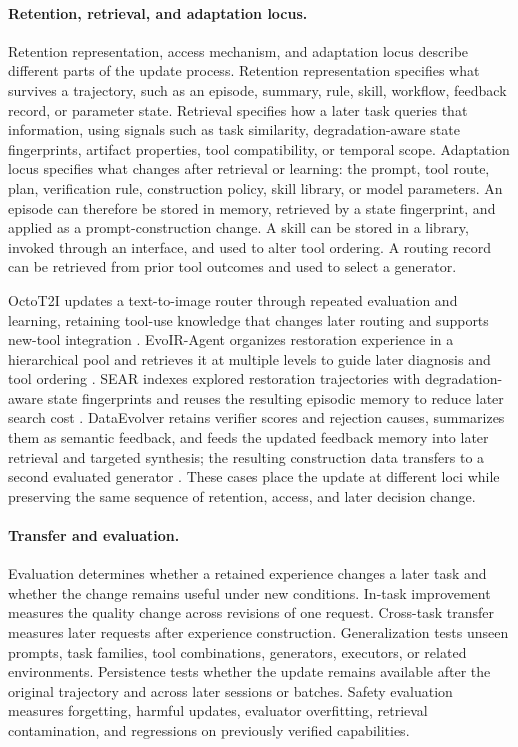 \paragraph{Retention, retrieval, and adaptation locus.}
Retention representation, access mechanism, and adaptation locus describe different parts of the update process. Retention representation specifies what survives a trajectory, such as an episode, summary, rule, skill, workflow, feedback record, or parameter state. Retrieval specifies how a later task queries that information, using signals such as task similarity, degradation-aware state fingerprints, artifact properties, tool compatibility, or temporal scope. Adaptation locus specifies what changes after retrieval or learning: the prompt, tool route, plan, verification rule, construction policy, skill library, or model parameters. An episode can therefore be stored in memory, retrieved by a state fingerprint, and applied as a prompt-construction change. A skill can be stored in a library, invoked through an interface, and used to alter tool ordering. A routing record can be retrieved from prior tool outcomes and used to select a generator.

OctoT2I updates a text-to-image router through repeated evaluation and learning, retaining tool-use knowledge that changes later routing and supports new-tool integration \cite{jiang2026octot2i}. EvoIR-Agent organizes restoration experience in a hierarchical pool and retrieves it at multiple levels to guide later diagnosis and tool ordering \cite{avg260522208}. SEAR indexes explored restoration trajectories with degradation-aware state fingerprints and reuses the resulting episodic memory to reduce later search cost \cite{avg260628971}. DataEvolver retains verifier scores and rejection causes, summarizes them as semantic feedback, and feeds the updated feedback memory into later retrieval and targeted synthesis; the resulting construction data transfers to a second evaluated generator \cite{avg260631537}. These cases place the update at different loci while preserving the same sequence of retention, access, and later decision change.

\paragraph{Transfer and evaluation.}
Evaluation determines whether a retained experience changes a later task and whether the change remains useful under new conditions. In-task improvement measures the quality change across revisions of one request. Cross-task transfer measures later requests after experience construction. Generalization tests unseen prompts, task families, tool combinations, generators, executors, or related environments. Persistence tests whether the update remains available after the original trajectory and across later sessions or batches. Safety evaluation measures forgetting, harmful updates, evaluator overfitting, retrieval contamination, and regressions on previously verified capabilities.

